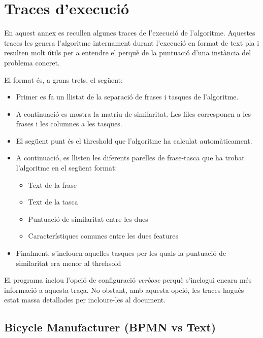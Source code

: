 \clearpage
\chapter{Traces d'execució}
\label{sec:traces_execucio}

En aquest annex es recullen algunes traces de l'execució de l'algoritme. Aquestes traces les genera l'algoritme internament durant l'execució en format de text pla i resulten molt útils per a entendre el perquè de la puntuació d'una instància del problema concret.

El format és, a grans trets, el següent:

\begin{itemize}
\item Primer es fa un llistat de la separació de frases i tasques de l'algoritme. 
\item A continuació es mostra la matriu de similaritat. Les files corresponen a les frases i les columnes a les tasques. 
\item El següent punt és el threshold que l'algoritme ha calculat automàticament.
\item A continuació, es llisten les diferents parelles de frase-tasca que ha trobat l'algoritme en el següent format:
      \begin{itemize}
        \item Text de la frase
        \item Text de la tasca
        \item Puntuació de similaritat entre les dues
        \item Característiques comunes entre les dues features
      \end{itemize}
\item Finalment, s'inclouen aquelles tasques per les quals la puntuació de similaritat era menor al threhsold
\end{itemize}

El programa inclou l'opció de configuració \emph{verbose} perquè s'inclogui encara més informació a aquesta traça. No obstant, amb aquesta opció, les traces hagués estat massa detallades per incloure-les al document.

\section{Bicycle Manufacturer (BPMN vs Text)}


%


